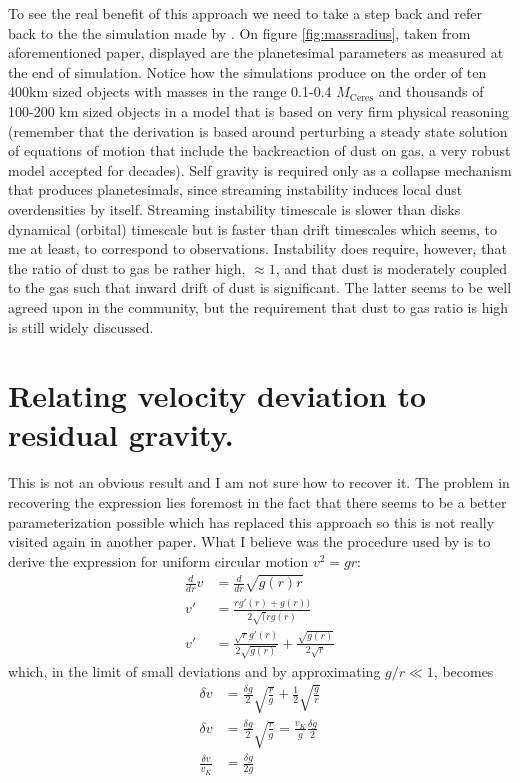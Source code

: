 \documentclass[12pt]{article}
\begin{document}
To see the real benefit of this approach we need to take a step back and refer back to the the simulation made by \cite{Simon16}. On figure \ref{fig:massradius}, taken from aforementioned paper, displayed are the planetesimal parameters as measured at the end of simulation. Notice how the simulations produce on the order of ten 400km sized objects with masses in the range 0.1-0.4 $M_\mathrm{Ceres}$ and thousands of 100-200 km sized objects in a model that is based on very firm physical reasoning
\noindent (remember that the derivation is based around perturbing a steady state solution of equations of motion that include the backreaction of dust on gas, a very robust model accepted for decades). Self gravity is required only as a collapse mechanism that produces planetesimals, since streaming instability induces local dust overdensities by itself. Streaming instability timescale is slower than disks dynamical (orbital) timescale but is faster than drift timescales which seems, to me at least, to correspond to observations. Instability does require, however, that the ratio of dust to gas be rather high, $\approx 1$, and that dust is moderately coupled to the gas such that inward drift of dust is significant. The latter seems to be well agreed upon in the community, but the requirement that dust to gas ratio is high is still widely discussed.


\newpage
\appendix

\section{Relating velocity deviation to residual gravity.}
\label{appendix:A}

This is not an obvious result and I am not sure how to recover it. The problem in recovering the expression lies foremost in the fact that there seems to be a better parameterization possible which has replaced this approach so this is not really visited again in another paper. What I believe was the procedure used by \citet{Weidenschilling77} is to derive the expression for uniform circular motion $v^2 = gr$:
\begin{align}
    \frac{d}{dr}v &= \frac{d}{dr}\sqrt{g(r)r} \\
    v' &= \frac{r g'(r) + g(r))}{2\sqrt(r g(r)} \\
    v' &= \frac{\sqrt{r} g'(r)}{2 \sqrt{g(r)}} + \frac{\sqrt{g(r)}}{2 \sqrt{r}} 
\end{align}
which, in the limit of small deviations and by approximating $g/r \ll 1$, becomes
\begin{align}
    \delta v &= \frac{\delta g}{2}\sqrt{\frac{r}{g}} + \frac{1}{2} \sqrt{\frac{g}{r}} \\
    \delta v &= \frac{\delta g}{2} \sqrt{\frac{r}{g}} = \frac{v_K}{g}\frac{\delta g}{2} \\
    \frac{\delta v }{v_K} &= \frac{\delta g}{2 g}
\end{align}
\end{document}
